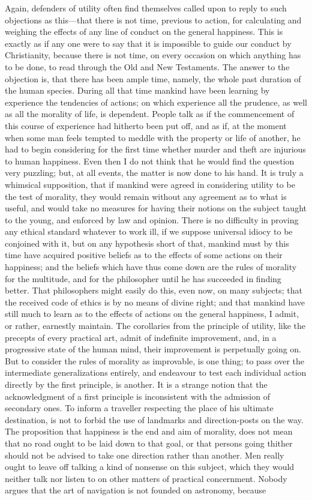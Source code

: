 \documentclass[12pt]{report}
\begin{document}
Again, defenders of utility often find themselves called upon to reply to such objections as this—that there is not time, previous to action, for calculating and weighing the effects of any line of conduct on the general happiness. This is exactly as if any one were to say that it is impossible to guide our conduct by Christianity, because there is not time, on every occasion on which anything has to be done, to read through the Old and New Testaments. The answer to the objection is, that there has been ample time, namely, the whole past duration of the human species. During all that time mankind have been learning by experience the tendencies of actions; on which experience all the prudence, as well as all the morality of life, is dependent. People talk as if the commencement of this course of experience had hitherto been put off, and as if, at the moment when some man feels tempted to meddle with the property or life of another, he had to begin considering for the first time whether murder and theft are injurious to human happiness. Even then I do not think that he would find the question very puzzling; but, at all events, the matter is now done to his hand. It is truly a whimsical supposition, that if mankind were agreed in considering utility to be the test of morality, they would remain without any agreement as to what is useful, and would take no measures for having their notions on the subject taught to the young, and enforced by law and opinion. There is no difficulty in proving any ethical standard whatever to work ill, if we suppose universal idiocy to be conjoined with it, but on any hypothesis short of that, mankind must by this time have acquired positive beliefs as to the effects of some actions on their happiness; and the beliefs which have thus come down are the rules of morality for the multitude, and for the philosopher until he has succeeded in finding better. That philosophers might easily do this, even now, on many subjects; that the received code of ethics is by no means of divine right; and that mankind have still much to learn as to the effects of actions on the general happiness, I admit, or rather, earnestly maintain. The corollaries from the principle of utility, like the precepts of every practical art, admit of indefinite improvement, and, in a progressive state of the human mind, their improvement is perpetually going on. But to consider the rules of morality as improvable, is one thing; to pass over the intermediate generalizations entirely, and endeavour to test each individual action directly by the first principle, is another. It is a strange notion that the acknowledgment of a first principle is inconsistent with the admission of secondary ones. To inform a traveller respecting the place of his ultimate destination, is not to forbid the use of landmarks and direction-posts on the way. The proposition that happiness is the end and aim of morality, does not mean that no road ought to be laid down to that goal, or that persons going thither should not be advised to take one direction rather than another. Men really ought to leave off talking a kind of nonsense on this subject, which they would neither talk nor listen to on other matters of practical concernment. Nobody argues that the art of navigation is not founded on astronomy, because 
\end{document}
